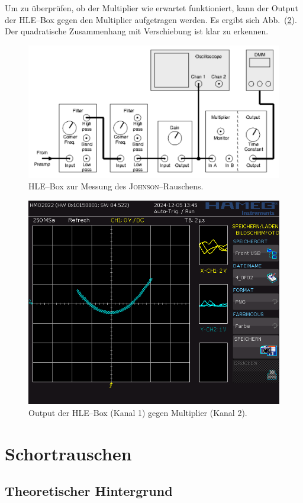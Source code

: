 \documentclass[sn-mathphys-num,iicol]{sn-jnl}
\theoremstyle{thmstyleone}
\theoremstyle{thmstyletwo}
\theoremstyle{thmstylethree}
\begin{document}
Um zu überprüfen, ob der Multiplier wie erwartet funktioniert, kann der Output der HLE--Box gegen den Multiplier aufgetragen werden.
Es ergibt sich Abb.\ (\ref{fig:multiplier}).
Der quadratische Zusammenhang mit Verschiebung ist klar zu erkennen.

\begin{figure}[t]
        \centering
        \includegraphics[width=.5\textwidth]{425_schaltplan_messung_johnson.png}
        \caption{HLE--Box zur Messung des \textsc{Johnson}--Rauschens.\cite{anleitung425}} \label{fig:johnson_hle_messung}
\end{figure}

\begin{figure}[t]
        \centering
        \includegraphics[width=.5\textwidth]{../data/4_0F02.png}
        \caption{Output der HLE--Box (Kanal 1) gegen Multiplier (Kanal 2).} \label{fig:multiplier}
\end{figure}

\section{Schortrauschen}
\subsection{Theoretischer Hintergrund}



\end{document}
